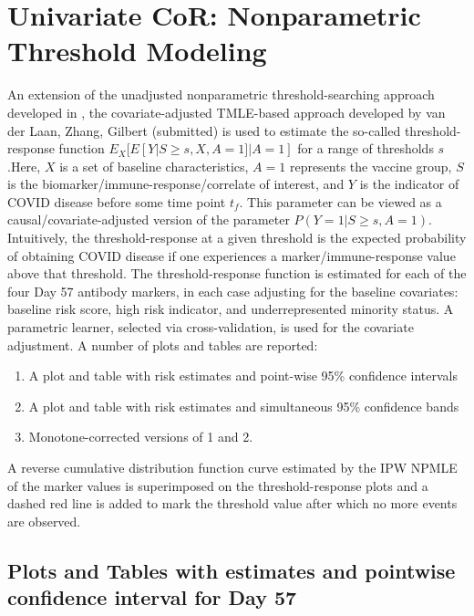 \documentclass[]{book}
\theoremstyle{definition}
\theoremstyle{definition}
\theoremstyle{definition}
\newcommand{\1}{\mathbbm{1}}
\begin{document}
\hypertarget{cor-threshold}{%
\chapter{Univariate CoR: Nonparametric Threshold Modeling}\label{cor-threshold}}

An extension of the unadjusted nonparametric threshold-searching approach
developed in \citet{Donovan}, the covariate-adjusted TMLE-based approach developed by
van der Laan, Zhang, Gilbert (submitted) is used to estimate the so-called
threshold-response function \(E_X[ E[Y|S \geq s, X, A = 1]|A=1]\) for a range of
thresholds \(s\).Here, \(X\) is a set of baseline characteristics, \(A=1\) represents
the vaccine group, \(S\) is the biomarker/immune-response/correlate of interest,
and \(Y\) is the indicator of COVID disease before some time point \(t_f\). This
parameter can be viewed as a causal/covariate-adjusted version of the parameter \(P(Y=1|S \geq s, A=1)\). Intuitively, the threshold-response at a given threshold is the expected
probability of obtaining COVID disease if one experiences a
marker/immune-response value above that threshold. The threshold-response
function is estimated for each of the four Day 57 antibody markers, in each case
adjusting for the baseline covariates: baseline risk score, high risk
indicator, and underrepresented minority status. A parametric learner, selected
via cross-validation, is used for the covariate adjustment. A number of plots
and tables are reported:

\begin{enumerate}
\item A plot and table with risk estimates and point-wise 95\% confidence intervals
\item A plot and table with risk estimates and simultaneous 95\% confidence bands
\item Monotone-corrected versions of 1 and 2.
\end{enumerate}

A reverse cumulative distribution function curve estimated by the IPW NPMLE of the marker values is superimposed on the threshold-response plots
and a dashed red line is added to mark the threshold value after which no more
events are observed.

\newpage

\hypertarget{plots-and-tables-with-estimates-and-pointwise-confidence-interval-for-day-57}{%
\section{Plots and Tables with estimates and pointwise confidence interval for Day 57}\label{plots-and-tables-with-estimates-and-pointwise-confidence-interval-for-day-57}}
\end{document}
